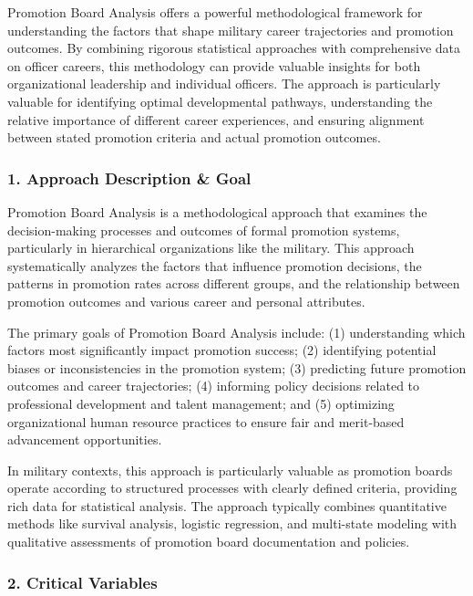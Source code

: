 \documentclass[./main.tex]{subfiles}
\begin{document}
Promotion Board Analysis offers a powerful methodological framework for
understanding the factors that shape military career trajectories and
promotion outcomes. By combining rigorous statistical approaches with
comprehensive data on officer careers, this methodology can provide
valuable insights for both organizational leadership and individual
officers. The approach is particularly valuable for identifying optimal
developmental pathways, understanding the relative importance of
different career experiences, and ensuring alignment between stated
promotion criteria and actual promotion outcomes.

\subsubsection{1. Approach Description \&
Goal}\label{approach-description-goal}

Promotion Board Analysis is a methodological approach that examines the
decision-making processes and outcomes of formal promotion systems,
particularly in hierarchical organizations like the military. This
approach systematically analyzes the factors that influence promotion
decisions, the patterns in promotion rates across different groups, and
the relationship between promotion outcomes and various career and
personal attributes.

The primary goals of Promotion Board Analysis include: (1) understanding
which factors most significantly impact promotion success; (2)
identifying potential biases or inconsistencies in the promotion system;
(3) predicting future promotion outcomes and career trajectories; (4)
informing policy decisions related to professional development and
talent management; and (5) optimizing organizational human resource
practices to ensure fair and merit-based advancement opportunities.

In military contexts, this approach is particularly valuable as
promotion boards operate according to structured processes with clearly
defined criteria, providing rich data for statistical analysis. The
approach typically combines quantitative methods like survival analysis,
logistic regression, and multi-state modeling with qualitative
assessments of promotion board documentation and policies.

\subsubsection{2. Critical Variables}\label{critical-variables}
\end{document}
